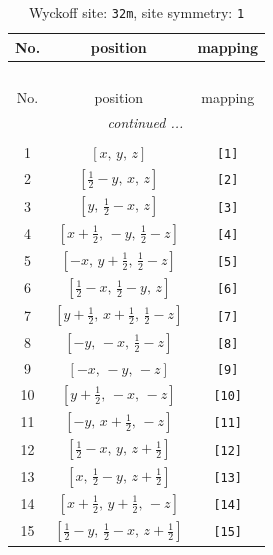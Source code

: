 \documentclass[fleqn,8pt]{jsarticle}
\begin{document}
\renewcommand{\arraystretch}{1.2}
\begin{longtable}{ccc}
\caption{Wyckoff site: {\tt 32m}, site symmetry: {\tt 1}}
 \\
 \hline \hline
No. & position & mapping \\ \hline \endfirsthead

\multicolumn{2}{l}{\tablename\ \thetable{}} \\
 \hline \hline
No. & position & mapping \\ \hline \endhead

 \hline \hline
\multicolumn{2}{r}{\footnotesize\it continued ...} \\ \endfoot

 \hline \hline
\multicolumn{2}{r}{} \\ \endlastfoot

1 & $\left[ x,\, y,\, z \right]$ & {\tt [1]} \\ \hline
2 & $\left[ \frac{1}{2} - y,\, x,\, z \right]$ & {\tt [2]} \\ \hline
3 & $\left[ y,\, \frac{1}{2} - x,\, z \right]$ & {\tt [3]} \\ \hline
4 & $\left[ x + \frac{1}{2},\, - y,\, \frac{1}{2} - z \right]$ & {\tt [4]} \\ \hline
5 & $\left[ - x,\, y + \frac{1}{2},\, \frac{1}{2} - z \right]$ & {\tt [5]} \\ \hline
6 & $\left[ \frac{1}{2} - x,\, \frac{1}{2} - y,\, z \right]$ & {\tt [6]} \\ \hline
7 & $\left[ y + \frac{1}{2},\, x + \frac{1}{2},\, \frac{1}{2} - z \right]$ & {\tt [7]} \\ \hline
8 & $\left[ - y,\, - x,\, \frac{1}{2} - z \right]$ & {\tt [8]} \\ \hline
9 & $\left[ - x,\, - y,\, - z \right]$ & {\tt [9]} \\ \hline
10 & $\left[ y + \frac{1}{2},\, - x,\, - z \right]$ & {\tt [10]} \\ \hline
11 & $\left[ - y,\, x + \frac{1}{2},\, - z \right]$ & {\tt [11]} \\ \hline
12 & $\left[ \frac{1}{2} - x,\, y,\, z + \frac{1}{2} \right]$ & {\tt [12]} \\ \hline
13 & $\left[ x,\, \frac{1}{2} - y,\, z + \frac{1}{2} \right]$ & {\tt [13]} \\ \hline
14 & $\left[ x + \frac{1}{2},\, y + \frac{1}{2},\, - z \right]$ & {\tt [14]} \\ \hline
15 & $\left[ \frac{1}{2} - y,\, \frac{1}{2} - x,\, z + \frac{1}{2} \right]$ & {\tt [15]} \\ \hline

\end{longtable}
\end{document}
